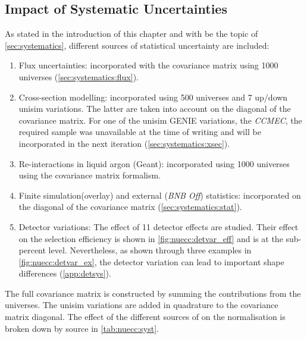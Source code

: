 \subsection{Impact of Systematic Uncertainties}
\label{sc:nuecc:syst}

As stated in the introduction of this chapter and with be the topic of \cref{sec:systematics}, different sources of statistical uncertainty are included:
\begin{enumerate}
    \item Flux uncertainties: incorporated with the covariance matrix using 1000 universes (\cref{sec:systematics:flux}).
    \item Cross-section modelling: incorporated using 500 universes and 7 up/down unisim variations. The latter are taken into account on the diagonal of the covariance matrix. For one of the unisim GENIE variations, the \textit{CCMEC}, the required sample was unavailable at the time of writing and will be incorporated in the next iteration (\cref{sec:systematics:xsec}). 
    \item Re-interactions in liquid argon (Geant): incorporated using 1000 universes using the covariance matrix formalism.
    \item Finite simulation(overlay) and external (\textit{BNB Off}) statistics: incorporated on the diagonal of the covariance matrix (\cref{sec:systematics:stat}).
    \item Detector variations: The effect of 11 detector effects are studied. Their effect on the selection efficiency is shown in \cref{fig:nuecc:detvar_eff} and is at the sub-percent level. Nevertheless, as shown through three examples in \cref{fig:nuecc:detvar_ex}, the detector variation can lead to important shape differences (\cref{app:detsys}). 
\end{enumerate}
The full covariance matrix is constructed by summing the contributions from the universes. The unisim variations are added in quadrature to the covariance matrix diagonal. The effect of the different sources of \systs on the normalisation is broken down by source in \cref{tab:nuecc:syst}. 

